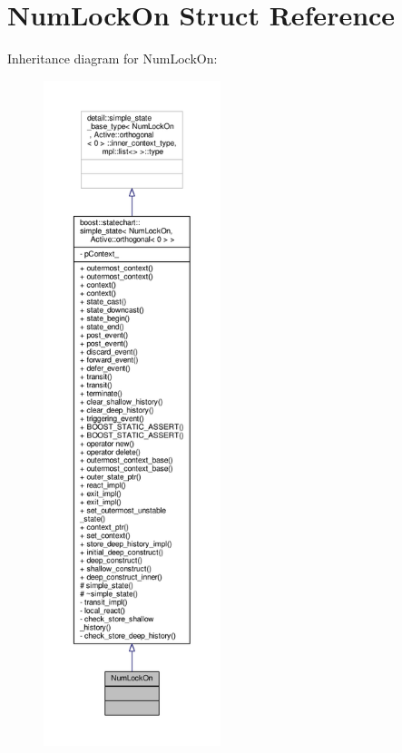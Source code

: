 \hypertarget{struct_num_lock_on}{}\section{Num\+Lock\+On Struct Reference}
\label{struct_num_lock_on}


Inheritance diagram for Num\+Lock\+On\+:
\nopagebreak
\begin{figure}[H]
\begin{center}
\leavevmode
\includegraphics[height=550pt]{struct_num_lock_on__inherit__graph}
\end{center}
\end{figure}


